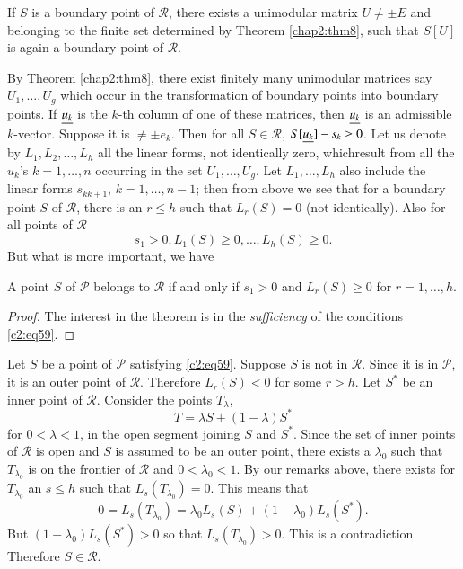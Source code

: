 \begin{thm}\label{chap2:thm9}
If $S$ is a boundary point of $\mathscr{R}$, there exists a unimodular
matrix $U\neq \pm E$ and belonging to the finite set determined by
Theorem \ref{chap2:thm8}, such that $S[U]$ is again a boundary point of
$\mathscr{R}$. 
\end{thm}

By Theorem \ref{chap2:thm8}, there exist finitely many unimodular matrices
say $U_{1},\ldots,U_{g}$ which occur in the transformation of boundary
points into boundary points. If $\underline{u_{k}}$ is the $k$-th column of
one of these matrices, then $\underline{u_{k}}$ is an admissible
$k$-vector. Suppose it is $\neq \pm e_{k}$. Then for all
$S\in\mathscr{R}$, $S[\underline{u_{k}}]-s_{k}\geq 0$. Let us denote by
$L_{1},L_{2},\ldots,L_{h}$ all the linear forms, not identically zero,
which\pageoriginale result from all the $u_{k}$'s $k=1,\ldots,n$
occurring in the set $U_{1},\ldots,U_{g}$. Let $L_{1},\ldots,L_{h}$
also include the linear forms $s_{kk+1}$, $k=1,\ldots,n-1$; then from
above we see that for a boundary point $S$ of $\mathscr{R}$, there is
an $r\leq h$ such that $L_{r}(S)=0$ (not identically). Also for all
points of $\mathscr{R}$
\begin{equation*}
s_{1}>0, L_{1}(S)\geq 0,\ldots,L_{h}(S)\geq 0.\tag{59}\label{c2:eq59}
\end{equation*}
But what is more important, we have

\begin{thm}\label{chap2:thm10}
A point $S$ of $\mathscr{P}$ belongs to $\mathscr{R}$ if and only if
$s_{1}>0$ and $L_{r}(S)\geq 0$ for $r=1,\ldots,h$.
\end{thm}

\begin{proof}
The interest in the theorem is in the {\em sufficiency} of the
conditions \eqref{c2:eq59}.
\end{proof}

Let $S$ be a point of $\mathscr{P}$ satisfying \eqref{c2:eq59}. Suppose $S$
is not in $\mathscr{R}$. Since it is in $\mathscr{P}$, it is an outer
point of $\mathscr{R}$. Therefore $L_{r}(S)<0$ for some $r>h$. Let
$S^{\ast}$ be an inner point of $\mathscr{R}$. Consider the points
$T_{\lambda}$, 
$$
T=\lambda S+(1-\lambda)S^{\ast}
$$
for $0<\lambda<1$, in the open segment joining $S$ and
$S^{\ast}$. Since the set of inner points of $\mathscr{R}$ is open and
$S$ is assumed to be an outer point, there exists a $\lambda_{0}$ such
that $T_{\lambda_{0}}$ is on the frontier of $\mathscr{R}$ and
$0<\lambda_{0}<1$. By our remarks above, there exists for
$T_{\lambda_{0}}$ an $s\leq h$ such that
$L_{s}(T_{\lambda_{0}})=0$. This means that
$$
0=L_{s}(T_{\lambda_{0}})=\lambda_{0}L_{s}(S)+(1-\lambda_{0})L_{s}(S^{\ast}).
$$
But $(1-\lambda_{0})L_{s}(S^{\ast})>0$ so that
$L_{s}(T_{\lambda_{0}})>0$. This is a contradiction. Therefore $S\in
\mathscr{R}$. 

